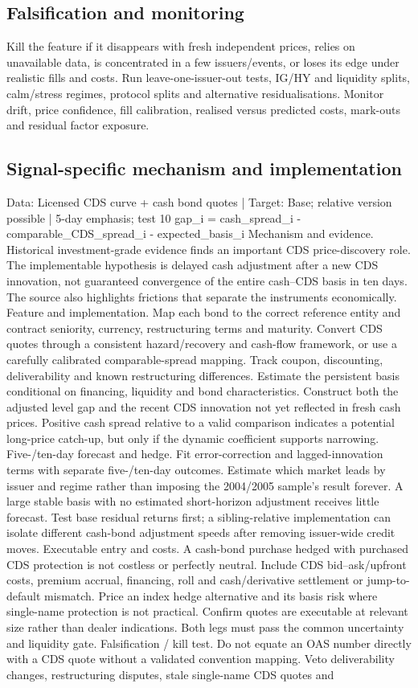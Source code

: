 \documentclass[10pt]{article}
\begin{document}
\subsection{Falsification and monitoring}
Kill the feature if it disappears with fresh independent prices, relies on unavailable data, is concentrated in a few issuers/events, or loses its edge under realistic fills and costs. Run leave-one-issuer-out tests, IG/HY and liquidity splits, calm/stress regimes, protocol splits and alternative residualisations. Monitor drift, price confidence, fill calibration, realised versus predicted costs, mark-outs and residual factor exposure.
\subsection{Signal-specific mechanism and implementation}
Data: Licensed CDS curve + cash bond quotes  |  Target: Base; relative version possible  |  5-day emphasis; test 10 gap\_i = cash\_spread\_i - comparable\_CDS\_spread\_i - expected\_basis\_i Mechanism and evidence.  Historical investment-grade evidence finds an important CDS price-discovery role. The implementable hypothesis is delayed cash adjustment after a new CDS innovation, not guaranteed convergence of the entire cash--CDS basis in ten days. The source also highlights frictions that separate the instruments economically. Feature and implementation.  Map each bond to the correct reference entity and contract seniority, currency, restructuring terms and maturity. Convert CDS quotes through a consistent hazard/recovery and cash-flow framework, or use a carefully calibrated comparable-spread mapping. Track coupon, discounting, deliverability and known restructuring differences. Estimate the persistent basis conditional on financing, liquidity and bond characteristics. Construct both the adjusted level gap and the recent CDS innovation not yet reflected in fresh cash prices. Positive cash spread relative to a valid comparison indicates a potential long-price catch-up, but only if the dynamic coefficient supports narrowing. Five-/ten-day forecast and hedge.  Fit error-correction and lagged-innovation terms with separate five-/ten-day outcomes. Estimate which market leads by issuer and regime rather than imposing the 2004/2005 sample’s result forever. A large stable basis with no estimated short-horizon adjustment receives little forecast. Test base residual returns first; a sibling-relative implementation can isolate different cash-bond adjustment speeds after removing issuer-wide credit moves. Executable entry and costs.  A cash-bond purchase hedged with purchased CDS protection is not costless or perfectly neutral. Include CDS bid--ask/upfront costs, premium accrual, financing, roll and cash/derivative settlement or jump-to-default mismatch. Price an index hedge alternative and its basis risk where single-name protection is not practical. Confirm quotes are executable at relevant size rather than dealer indications. Both legs must pass the common uncertainty and liquidity gate. Falsification / kill test.  Do not equate an OAS number directly with a CDS quote without a validated convention mapping. Veto deliverability changes, restructuring disputes, stale single-name CDS quotes and 
\end{document}
